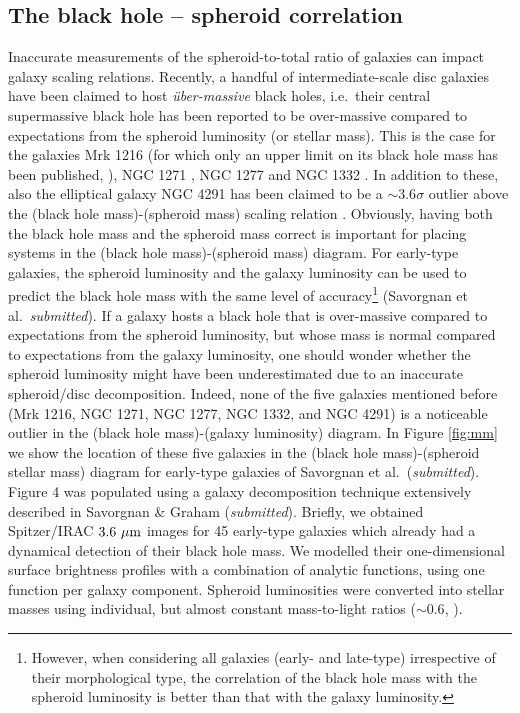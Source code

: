 \documentclass[useAMS,usenatbib,article]{mn2e}
\begin{document}
\subsection{The black hole -- spheroid correlation}
\label{sec:mm}
Inaccurate measurements of the spheroid-to-total ratio of galaxies can impact galaxy scaling relations. 
Recently, a handful of intermediate-scale disc galaxies have been claimed to host \emph{{\"u}ber-massive} black holes, 
i.e.~their central supermassive black hole has been reported to be 
over-massive compared to expectations from the spheroid luminosity (or stellar mass).
This is the case for the galaxies Mrk 1216 (for which only an upper limit on its black hole mass has been published, 
\citealt{yildirim2015}), NGC 1271 \citep{walsh2015}, 
NGC 1277 \citep{vandenbosch2012,yildirim2015} and NGC 1332 \citep{rusli2011}.
In addition to these, also the elliptical galaxy NGC 4291 has been claimed to be a $\sim$$3.6\sigma$ outlier 
above the (black hole mass)-(spheroid mass) scaling relation \citep{bogdan2012}. 
Obviously, having both the black hole mass and the spheroid mass correct is important 
for placing systems in the (black hole mass)-(spheroid mass) diagram. 
For early-type galaxies, the spheroid luminosity and the galaxy luminosity 
can be used to predict the black hole mass with the same level of accuracy\footnote{However, 
when considering all galaxies (early- and late-type) irrespective of their morphological type, 
the correlation of the black hole mass with the spheroid luminosity is better than that with the galaxy luminosity.} 
(Savorgnan et al.~\emph{submitted}). 
If a galaxy hosts a black hole that is over-massive compared to expectations from the spheroid luminosity, 
but whose mass is normal compared to expectations from the galaxy luminosity, 
one should wonder whether the spheroid luminosity might have been underestimated 
due to an inaccurate spheroid/disc decomposition. 
Indeed, none of the five galaxies mentioned before (Mrk 1216, NGC 1271, NGC 1277, NGC 1332, and NGC 4291) is a noticeable outlier 
in the (black hole mass)-(galaxy luminosity) diagram. 
In Figure \ref{fig:mm} we show the location of these five galaxies in the (black hole mass)-(spheroid stellar mass) diagram 
for early-type galaxies of Savorgnan et al.~(\emph{submitted}). 
Figure 4 was populated using a galaxy decomposition technique extensively described in Savorgnan \& Graham (\emph{submitted}). 
Briefly, we obtained Spitzer/IRAC $3.6~\rm \mu m$ images for 45 early-type galaxies 
which already had a dynamical detection of their black hole mass. 
We modelled their one-dimensional surface brightness profiles with a combination of analytic functions, using one function per galaxy component. 
Spheroid luminosities were converted into stellar masses using individual, but almost constant mass-to-light ratios ($\sim$$0.6$, \citealt{meidt2014-MNRAS}). 
\end{document}

